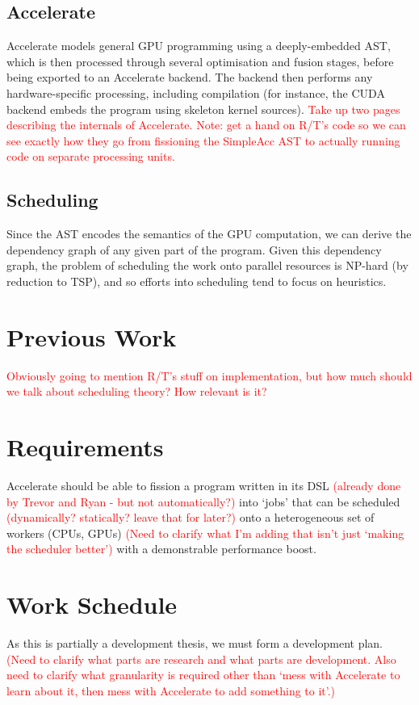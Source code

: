 \documentclass[a4paper,12pt]{article}
\newcommand{\red}[1]{\textcolor{red}{#1}}
\begin{document}
\begin{multicols}{2}
\subsection{Accelerate}

Accelerate models general GPU programming using a deeply-embedded AST, which is then processed through several optimisation and fusion stages, before being exported to an Accelerate backend. The backend then performs any hardware-specific processing, including compilation (for instance, the CUDA backend embeds the program using skeleton kernel sources). \red{Take up two pages describing the internals of Accelerate. Note: get a hand on R/T's code so we can see exactly how they go from fissioning the SimpleAcc AST to actually running code on separate processing units.}

\subsection{Scheduling}

Since the AST encodes the semantics of the GPU computation, we can derive the dependency graph of any given part of the program. Given this dependency graph, the problem of scheduling the work onto parallel resources is NP-hard (by reduction to TSP), and so efforts into scheduling tend to focus on heuristics.


\section{Previous Work}

\red{Obviously going to mention R/T's stuff on implementation, but how much should we talk about scheduling theory? How relevant is it?}


\section{Requirements}

Accelerate should be able to fission a program written in its DSL \red{(already done by Trevor and Ryan - but not automatically?)} into `jobs' that can be scheduled \red{(dynamically? statically? leave that for later?)} onto a heterogeneous set of workers (CPUs, GPUs) \red{(Need to clarify what I'm adding that isn't just `making the scheduler better')} with a demonstrable performance boost.


\section{Work Schedule}

As this is partially a development thesis, we must form a development plan. \red{(Need to clarify what parts are research and what parts are development. Also need to clarify what granularity is required other than `mess with Accelerate to learn about it, then mess with Accelerate to add something to it'.)}

\end{multicols}

\pagebreak

\footnotesize



\end{document}
